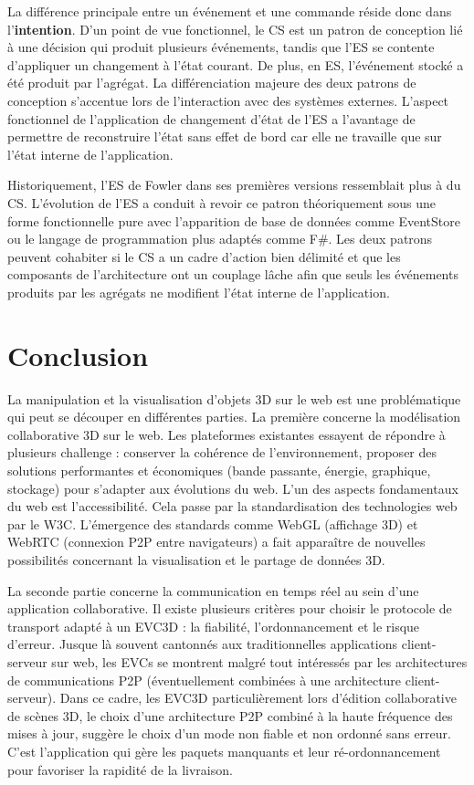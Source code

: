 La différence principale entre un événement et une commande réside donc dans 
l'\textbf{intention}. D'un point de vue fonctionnel, le \gls{CS} est un patron de 
conception lié à une décision qui produit plusieurs événements, tandis que 
l'\gls{ES} se contente d'appliquer un changement à l'état courant. De plus, en 
\gls{ES}, l'événement stocké a été produit par l'agrégat. 
La différenciation majeure des deux patrons de conception s'accentue lors de 
l'interaction avec des systèmes externes. L'aspect fonctionnel de l'application de 
changement d'état de l'\gls{ES} a l'avantage de permettre de reconstruire l'état sans 
effet de bord car elle ne travaille que sur l'état interne de l'application. 

Historiquement, l'\gls{ES} de Fowler dans ses premières versions ressemblait plus 
à du \gls{CS}. L'évolution de l'\gls{ES} a conduit à revoir ce patron théoriquement 
sous une forme fonctionnelle pure avec l'apparition de base de données comme 
EventStore ou le langage de programmation plus adaptés comme F\#. Les deux 
patrons peuvent cohabiter si le \gls{CS} a un cadre d'action bien délimité 
et que les composants de l'architecture ont un couplage lâche afin que seuls les 
événements produits par les agrégats ne modifient l'état interne de l'application. 

\section{Conclusion}

La manipulation et la visualisation d'objets 3D sur le web est une problématique 
qui peut se découper en différentes parties.
La première concerne la modélisation collaborative 3D sur le web. Les plateformes 
existantes essayent de répondre à plusieurs challenge : conserver la cohérence 
de l'environnement, proposer des solutions performantes et économiques (bande 
passante, énergie, graphique, stockage)  pour s'adapter aux évolutions du web.
L'un des aspects fondamentaux du web est l'accessibilité. Cela passe par la 
standardisation des technologies web par le \gls{W3C}.  L'émergence des 
standards comme WebGL (affichage 3D) et WebRTC (connexion P2P entre 
navigateurs) a fait apparaître de nouvelles possibilités concernant la visualisation 
et le partage de données 3D. 


La seconde partie concerne la communication en temps réel au sein d'une 
application collaborative. Il existe plusieurs critères pour choisir le protocole de 
transport adapté à un \gls{EVC3D} : la fiabilité, l'ordonnancement et le risque 
d'erreur. 
Jusque là souvent cantonnés aux traditionnelles 
applications client-serveur sur web, les \glspl{EVC} se montrent malgré tout 
intéressés par les architectures de communications P2P (éventuellement 
combinées à une architecture client-serveur). Dans ce cadre, les \gls{EVC3D} 
particulièrement lors d'édition collaborative de scènes 3D, le choix d'une 
architecture \gls{P2P} combiné à la haute fréquence des mises à jour, suggère le 
choix d'un mode non fiable et non ordonné sans erreur. C'est l'application qui gère 
les 
paquets manquants et leur ré-ordonnancement pour favoriser la rapidité 
de la livraison.

